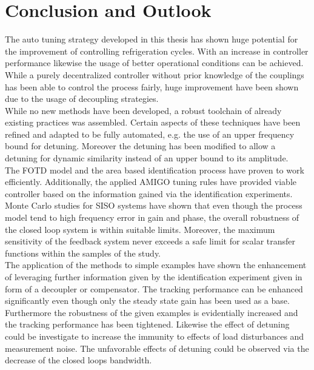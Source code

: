 \chapter{Conclusion and Outlook}
\label{c:conclusion}

The auto tuning strategy developed in this thesis has shown huge potential for the improvement of controlling refrigeration cycles. With an increase in controller performance likewise the usage of better operational conditions can be achieved. While a purely decentralized controller without prior knowledge of the couplings has been able to control the process fairly, huge improvement have been shown due to the usage of decoupling strategies.\\

While no new methods have been developed, a robust toolchain of already existing practices was assembled. Certain aspects of these techniques have been refined and adapted to be fully automated, e.g. the use of an upper frequency bound for detuning. Moreover the detuning has been modified to allow a detuning for dynamic similarity instead of an upper bound to its amplitude.\\

The FOTD model and the area based identification process have proven to work efficiently. Additionally, the applied AMIGO tuning rules have provided viable controller based on the information gained via the identification experiments. Monte Carlo studies for SISO systems have shown that even though the process model tend to high frequency error in gain and phase, the overall robustness of the closed loop system is within suitable limits. Moreover, the maximum sensitivity of the feedback system never exceeds a safe limit for scalar transfer functions within the samples of the study.\\

The application of the methods to simple examples have shown the enhancement of leveraging further information given by the identification experiment given in form of a decoupler or compensator. The tracking performance can be enhanced significantly even though only the steady state gain has been used as a base. Furthermore the robustness of the given examples is evidentially increased and the tracking performance has been tightened. Likewise the effect of detuning could be investigate to increase the immunity to effects of load disturbances and measurement noise. The unfavorable effects of detuning could be observed via the decrease of the closed loops bandwidth.\\

